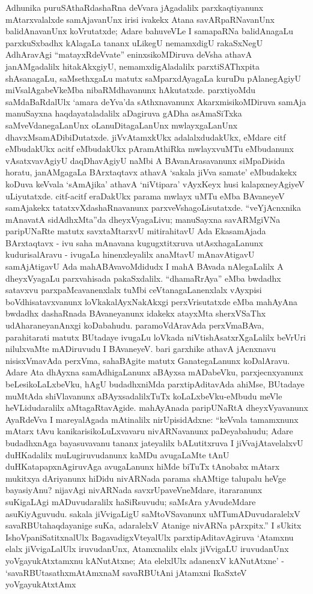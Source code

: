 Adhunika puruSAthaRdashaRna deVvara jAgadalilx parxkaqtiyanunx mAtarxvalalxde samAja\-vanUnx irisi ivakekx Atana savARpaRNavanUnx balidAnavanUnx koVrutatxde; Adare bahuveVLe I samapaRNa balidAnagaLu parxkuSxbadhx kAlagaLa tananx uLikegU nemamxdigU rakaSxNegU AdhAravAgi ``matayxRdeVvate'' eninxsikoMDiruva deVsha athavA janAMgadalilx hita\-kAkxgiyU, nemamxdigAladalilx parxtiSAThxpita shAsanagaLu, saMsethxgaLu matutx saMparxdAya\-gaLa kuruDu pAlanegAgiyU miVsalAgabeVkeMba nibaRMdhavanunx hAkutatxde. parxtiyoMdu saMdaBaRdalUlx `amara deYva'da sAthxnavanunx AkarxmisikoMDiruva samAja manuSayxna haqdayataladalilx aDagiruva gADha asAmaSiTxka saMveVdanegaLanUnx oLanuDitagaLanUnx mwlayxgaLanUnx dhavxMsamADibiDutatxde. jiVvAtamxkUkx adalalxdudakUkx, eMdare citf eMbu\-dakUkx acitf eMbudakUkx pAramAthiRka mwlayxvuMTu eMbudanunx vAsatxvavAgiyU daqDhavAgiyU naMbi A BAvanArasavanunx siMpaDisida horatu, janAMgagaLa BArxtaqtavx athavA `sakala jiVva samate' eMbudakekx koDuva keVvala `sAmAjika' athavA `niVtipara' vAyxKeyx husi kalapxneyAgiyeV uLiyutatxde. citf-acitf eraDakUkx parama mwlayx uMTu eMba BAvaneyeV samAjakekx tatatxvXdashaRnavanunx parxveVshagoLisutatxde. ``veYjAcnx\-nika mAnavatA sidAdhxMta''da dheyxVyagaLivu; manuSayxna savARMgiVNa paripUNaRte matutx savxtaMtarxvU mitirahitavU Ada EkasamAjada BArxtaqtavx - ivu saha mAnavana kugugx\-titxruva utAsxhagaLanunx kudurisalAravu - ivugaLa hinenxleyalilx anaMtavU mAna\-vAtigavU samAjAtigavU Ada mahABAvavoMdidudx I mahA BAvada nAlegaLalilx A dheyxVya\-gaLu parxvahisada pakaSxdalilx. ``dhamaRrAya'' eMba bwdadhx satavxvu parxpaMcavanenxlalx tuMbi ceVtanagaLanenxlalx vAyxpisi boVdhisatavxvanunx loVkakalAyxNakAkxgi perxVrisutatxde eMba mahA\-yAna bwdadhx dashaRnada BAvaneyanunx idakekx atayxMta sherxVSaThx udAharaneyanAnxgi koDa\-bahudu. paramoVdAravAda perxVmaBAva, parahitarati matutx BUtadaye ivu\-gaLu loVkada niVtishAsatxrXgaLalilx beVrUri nilulxvaMte mADiruvudu I BAvaneyeV. bari \hbox{garxhike} athavA jAcnxnavu nisisxVmavAda perxVma, sahaBAgite matutx GanategaLanunx koDa\-lAravu. Adare Ata dhAyxna samAdhigaLanunx aBAyxsa mADabeVku, parxjecnxyanunx beLesi\-koLaLxbeVku, hAgU budadhxniMda parxtipAditavAda ahiMse, BUtadaye muMtAda shiVla\-vanunx aBAyxsa\-dalilxTuTx koLaLxbeVku-eMbudu meVle heVLidudaralilx aMtagaRtavAgide. mahAyAnada paripUNaRtA dheyxVyavanunx AyaRdeVva I mareyalAgada mAti\-nalilx nirUpisidAdxne: ``keVvala tamamxnunx mAtarx tAvu kanikarisikoLuLxvavaru nivARNa\-vanunx paDeyabahudu; Adare budadhxnAga bayasuvavanu tananx jateyalilx bALutitxruva I jiVvajAtavelalxvU duHKadalilx muLugiruvudanunx kaMDu avugaLaMte tAnU duHKa\-tapapxnAgiruvAga avu\-gaLanunx hiMde biTuTx tAnobabx mAtarx mukitxya dAriyanunx hiDidu nivARNada parama shAMtige talupalu heVge bayasiyAnu? nijavAgi nivARNada savxrUpaveVneMdare, itararanunx suKigaLAgi mADuvudaralilx haSiRsuvudu; saMsAra yAvudeMdare asuKi\-yAguvudu. sakala jiVvigaLigU saMtoVSavanunx uMTu\-mADuvudaralelxV savaR\-BUta\-haqdayanige suKa, adaralelxV Atanige nivARNa pArxpitx.'' I sUkitx IshoVpaniSatitx\-nalUlx BagavadigxVteyalUlx parxti\-pAdita\-vAgiruva `Atamxnu elalx jiVvigaLalUlx iruvudanUnx, Atamxnalilx elalx jiVvigaLU iruvudanUnx yoVgayukAtxtamxnu kANutAtxne; Ata elelxlUlx adanenxV kANutAtxne' - `savaR\-BUtasathxmAtAmxnaM savaRBUtAni jAtamxni \eng{\rule{.03cm}{.2cm}} IkaSxteV yoVga\-yukAtxtAmx 